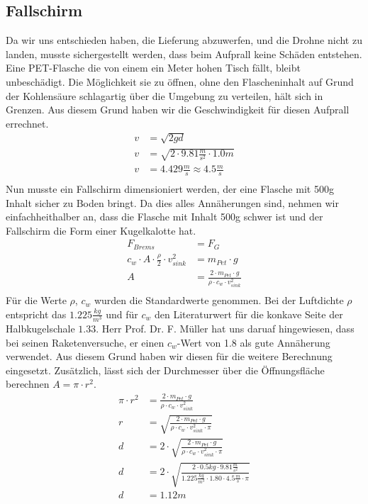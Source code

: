 \subsection{Fallschirm}
Da wir uns entschieden haben, die Lieferung abzuwerfen, und die Drohne nicht zu landen, musste sichergestellt werden, dass beim Aufprall keine Schäden entstehen.
\\
Eine PET-Flasche die von einem ein Meter hohen Tisch fällt, bleibt unbeschädigt. Die Möglichkeit sie zu öffnen, ohne den Flascheninhalt auf Grund der Kohlensäure schlagartig über die Umgebung zu verteilen, hält sich in Grenzen. Aus diesem Grund haben wir die Geschwindigkeit für diesen Aufprall errechnet.
\begin{equation}
\begin{split}
v &= \sqrt{2gd} \\
v &= \sqrt{2 \cdot 9.81\frac{m}{s^2} \cdot 1.0m} \\
v &= 4.429 \frac{m}{s} \approx 4.5 \frac{m}{s} \\
\end{split}
\end{equation}
Nun musste ein Fallschirm dimensioniert werden, der eine Flasche mit 500g Inhalt sicher zu Boden bringt. Da dies alles Annäherungen sind, nehmen wir einfachheithalber an, dass die Flasche mit Inhalt 500g schwer ist und der Fallschirm die Form einer Kugelkalotte hat. 
\begin{equation}
\begin{split}
F_{Brems} &= F_{G} \\
c_{w} \cdot A \cdot \frac{\rho}{2} \cdot v_{sink}^{2} &= m_{Pet} \cdot g \\
A &= \frac{2 \cdot m_{Pet} \cdot g}{\rho \cdot c_{w} \cdot v_{sink}^{2} } \\
\end{split}
\end{equation}
Für die Werte $\rho$, $c_w$ wurden die Standardwerte genommen. Bei der Luftdichte $\rho$ entspricht das $1.225 \frac{kg}{m^3}$ und für $c_w$ den Literaturwert für die konkave Seite der Halbkugelschale $1.33$. Herr Prof. Dr. F. Müller hat uns daruaf hingewiesen, dass bei seinen Raketenversuche, er einen $c_w$-Wert von 1.8 als gute Annäherung verwendet. Aus diesem Grund haben wir diesen für die weitere Berechnung eingesetzt. Zusätzlich, lässt sich der Durchmesser über die Öffnungsfläche berechnen $A = \pi \cdot r^2$.
\begin{equation}
\begin{split}
\pi \cdot r^2 &= \frac{2 \cdot m_{Pet} \cdot g}{\rho \cdot c_{w} \cdot v_{sink}^{2} } \\
r &= \sqrt{\frac{2 \cdot m_{Pet} \cdot g}{\rho \cdot c_{w} \cdot v_{sink}^{2} \cdot \pi}} \\
d &= 2 \cdot \sqrt{\frac{2 \cdot m_{Pet} \cdot g}{\rho \cdot c_{w} \cdot v_{sink}^{2} \cdot \pi}} \\
d &= 2 \cdot \sqrt{\frac{2 \cdot 0.5kg \cdot  9.81\frac{m}{s^2}}{1.225 \frac{kg}{m^3} \cdot 1.80 \cdot 4.5 \frac{m}{s} \cdot \pi}} \\
d &= 1.12m \\
\end{split}
\end{equation}
